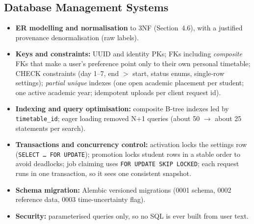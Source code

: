 \subsection{Database Management Systems}
\begin{itemize}
\item \textbf{ER modelling and normalisation} to 3NF (Section~4.6), with a justified provenance
      denormalisation (raw labels).
\item \textbf{Keys and constraints:} UUID and identity PKs; FKs including \emph{composite} FKs
      that make a user's preference point only to their own personal timetable; CHECK constraints (day
      1--7, end $>$ start, status enums, single-row settings); \emph{partial unique} indexes (one open
      academic placement per student; one active academic year; idempotent uploads per client request id).
\item \textbf{Indexing and query optimisation:} composite B-tree indexes led by
      \texttt{timetable\_id}; eager loading removed N+1 queries (about 50 $\rightarrow$ about 25
      statements per search).
\item \textbf{Transactions and concurrency control:} activation locks the settings row
      (\texttt{SELECT \ldots{} FOR UPDATE}); promotion locks student rows in a stable order to avoid
      deadlocks; job claiming uses \texttt{FOR UPDATE SKIP LOCKED}; each request runs in one
      transaction, so it sees one consistent snapshot.
\item \textbf{Schema migration:} Alembic versioned migrations (0001 schema, 0002 reference data, 0003
      time-uncertainty flag).
\item \textbf{Security:} parameterised queries only, so no SQL is ever built from user text.
\end{itemize}

